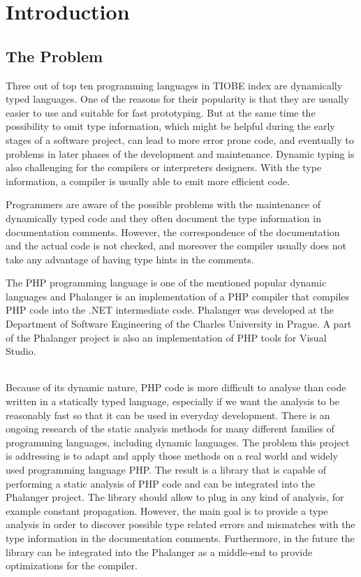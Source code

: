 \chapter{Introduction}

    \section{The Problem}
    
    Three out of top ten programming languages in TIOBE index\cite{tiobe} 
    are dynamically typed languages. One of the reasons for their popularity 
    is that they are usually easier to use and suitable for fast prototyping.
    But at the same time the possibility to omit type information, which might 
    be helpful during the early stages of a software project, can lead to more 
    error prone code, and eventually to problems in later phases of the 
    development and maintenance. Dynamic typing is also challenging for the 
    compilers or interpreters designers. With the type information, 
    a compiler is usually able to emit more efficient code.
    
    Programmers are aware of the possible problems with the maintenance of 
    dynamically typed code and they often document the type information in 
    documentation comments. However, the correspondence of the documentation 
    and the actual code is not checked, and moreover the compiler usually 
    does not take any advantage of having type hints in the comments.
    
    The PHP programming language is one of the mentioned popular dynamic 
    languages and Phalanger \cite{benda2006phalanger} is an implementation of a PHP compiler 
    that compiles PHP code into the .NET intermediate code. Phalanger was 
    developed at the Department of Software Engineering 
    of the Charles University in Prague. A part of the 
    Phalanger project is also an implementation of PHP tools 
    for Visual Studio.

    \subparagraph*{}    
    Because of its dynamic nature, PHP code is more difficult to analyse 
    than code written in a statically typed language, especially if we want the 
    analysis to be reasonably fast so that it can be used 
    in everyday development.  There is an ongoing research of the 
    static analysis methods for many different families of programming languages, 
    including dynamic languages. The problem this project is addressing 
    is to adapt and apply those methods on a real world and widely 
    used programming language PHP. The result is a library that is capable of 
    performing a static analysis of PHP code and can be integrated into 
    the Phalanger project. The library should allow to plug in any 
    kind of analysis, for example constant propagation. However, the main goal 
    is to provide a type analysis in order to discover possible type 
    related errors and mismatches with the type information in the 
    documentation comments. Furthermore, in the future the library 
    can be integrated into the Phalanger as a middle-end to provide 
    optimizations for the compiler.

